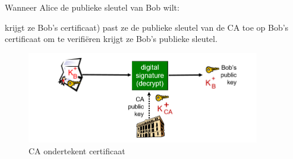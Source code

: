 \noindent Wanneer Alice de publieke sleutel van Bob wilt:

\bi
\itf krijgt ze Bob’s certificaat)
\itf past ze de publieke sleutel van de CA toe op Bob’s certificaat om te verifiëren
\itf krijgt ze Bob’s publieke sleutel. 
\ei

\begin{figure}[h]
    \centering
\includegraphics[width=4in]{./img/imghfdst8/hfdst8puntje12.png}
\caption{CA ondertekent certificaat }      
    \label{fig:CA ondertekent certificaat }
\end{figure}